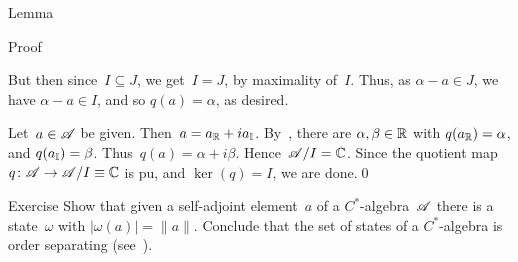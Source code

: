\documentclass[a]{subfiles}
\begin{document}
\begin{parsec}
\begin{point}{Lemma}
\begin{point}{Proof}
\begin{point}
But then since~$I\subseteq J$,
we get~$I=J$, by maximality of~$I$.
Thus, as $\alpha-a\in J$, we have $\alpha-a\in I$,
and so $q(a)=\alpha$, as desired.
\end{point}
\begin{point}%
Let~$a\in \mathscr{A}$ be given.
Then~$a=a_{\mathbb{R}}+ia_{\mathbb{I}}$.
By~,
there are $\alpha,\beta\in \mathbb{R}$ with $q(a_{\mathbb{R}})=\alpha$,
and $q(a_{\mathbb{I}})=\beta$.
Thus~$q(a)=\alpha+i\beta$.
Hence~$\mathscr{A}/I=\mathbb{C}$.
Since the quotient map $q\colon \mathscr{A}\to \mathscr{A}/I\equiv \mathbb{C}$
is pu, and $\ker(q)=I$, we are done.\qed
\end{point}
\end{point}
\begin{point}{Exercise}%
Show that given a self-adjoint element~$a$
of a $C^*$-algebra~$\mathscr{A}$
there is a state~$\omega$ with $\left|\omega (a)\right| = \|a\|$.
Conclude that the set of states of a $C^*$-algebra
is order separating (see~).
\end{point}
\end{point}
\end{parsec}
\end{document}
